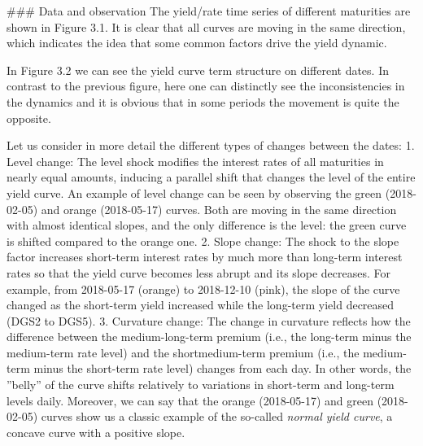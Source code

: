 \begin{enumerate}
### Data and observation
The yield/rate time series of different maturities are shown in Figure 3.1. It is clear that all curves are moving in the same direction, which indicates the idea that some common factors drive the yield dynamic.

In Figure 3.2 we can see the yield curve term structure on different dates. In contrast to the previous figure, here one can distinctly see the inconsistencies in the dynamics and it is obvious that in some periods the movement is quite the opposite.


Let us consider in more detail the different types of changes between the dates:
1. Level change: The level shock modifies the interest rates of all maturities in nearly equal amounts, inducing a parallel shift that changes the level of the entire yield curve. An example of level change can be seen by observing the green (2018-02-05) and orange (2018-05-17) curves. Both are moving in the same direction with almost identical slopes, and the only difference is the level: the green curve is shifted compared to the orange one.
2. Slope change: The shock to the slope factor increases short-term interest rates by much more than long-term interest rates so that the yield curve becomes less abrupt and its slope decreases.
For example, from 2018-05-17 (orange) to 2018-12-10 (pink), the slope of the curve changed as the short-term yield increased while the long-term yield decreased (DGS2 to DGS5).
3. Curvature change: The change in curvature reflects how the difference between the medium-long-term premium (i.e., the long-term minus the medium-term rate level) and the shortmedium-term premium (i.e., the medium-term minus the short-term rate level) changes from each day. In other words, the ”belly” of the curve shifts relatively to variations in short-term and long-term levels daily. Moreover, we can say that the orange (2018-05-17) and green (2018-02-05) curves show us a classic example of the so-called \emph{normal yield curve}, a concave curve with a positive slope.








\end{enumerate}
